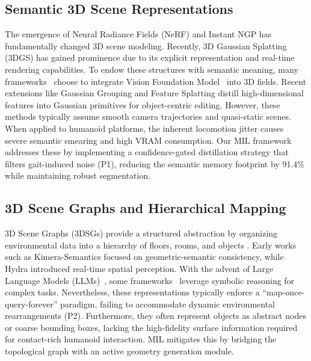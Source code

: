 \documentclass[conference]{IEEEtran}
\begin{document}
\subsection{Semantic 3D Scene Representations}
The emergence of Neural Radiance Fields (NeRF) \cite{mildenhall2021nerf} and Instant NGP \cite{muller2022instant} has fundamentally changed 3D scene modeling. Recently, 3D Gaussian Splatting (3DGS) \cite{kerbl20233d} has gained prominence due to its explicit representation and real-time rendering capabilities. To endow these structures with semantic meaning, many frameworks~\cite{kerr2023lerf, kirillov2023segment, peng2023openscene, shi2024language, kobayashi2022decomposing, engelmann2024opennerf, gadre2023cows} choose to integrate Vision Foundation Model~\cite{kirillov2023segment, radford2021learning, oquab2024dinov2} into 3D fields. Recent extensions like Gaussian Grouping \cite{gaussian_grouping} and Feature Splatting \cite{qiu2024featuresplatting} distill high-dimensional features into Gaussian primitives for object-centric editing. However, these methods typically assume smooth camera trajectories and quasi-static scenes. When applied to humanoid platforms, the inherent locomotion jitter causes severe semantic smearing and high VRAM consumption. Our MIL framework addresses these by implementing a confidence-gated distillation strategy that filters gait-induced noise (P1), reducing the semantic memory footprint by 91.4\% while maintaining robust segmentation.

\subsection{3D Scene Graphs and Hierarchical Mapping}
3D Scene Graphs (3DSGs) provide a structured abstraction by organizing environmental data into a hierarchy of floors, rooms, and objects \cite{armeni20193d, Werby-RSS-24, wu2021scenegraphfusion, wald2020learning, bavle2022situational}. Early works such as Kimera-Semantics \cite{rosinol20203d} focused on geometric-semantic consistency, while Hydra \cite{hughes2022hydra} introduced real-time spatial perception. With the advent of Large Language Models (LLMs)~\cite{hurst2024gpt}, some frameworks~\cite{pmlr-v270-xu25b, Werby-RSS-24, rana2023sayplan, chalvatzaki2023learning, ni2024grid, yin2024sg} leverage symbolic reasoning for complex tasks. Nevertheless, these representations typically enforce a ``map-once-query-forever'' paradigm, failing to accommodate dynamic environmental rearrangements (P2). Furthermore, they often represent objects as abstract nodes or coarse bounding boxes, lacking the high-fidelity surface information required for contact-rich humanoid interaction. MIL mitigates this by bridging the topological graph with an active geometry generation module.
\end{document}
